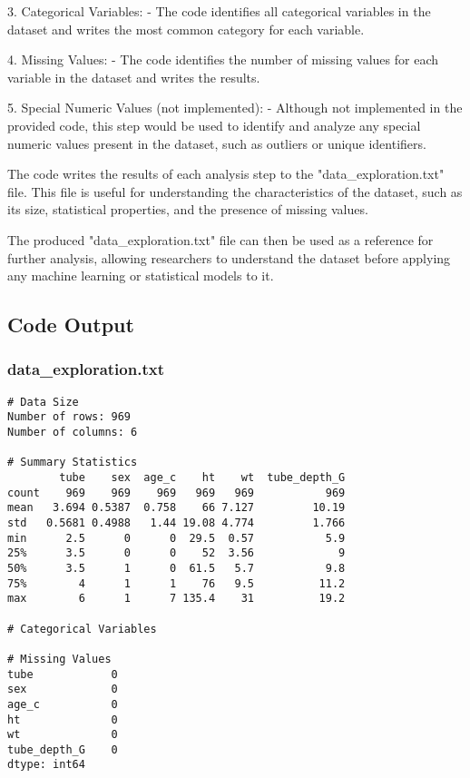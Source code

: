 \documentclass[11pt]{article}
\begin{document}
3. Categorical Variables:
   - The code identifies all categorical variables in the dataset and writes the most common category for each variable.

4. Missing Values:
   - The code identifies the number of missing values for each variable in the dataset and writes the results.

5. Special Numeric Values (not implemented):
   - Although not implemented in the provided code, this step would be used to identify and analyze any special numeric values present in the dataset, such as outliers or unique identifiers.

The code writes the results of each analysis step to the "data\_exploration.txt" file. This file is useful for understanding the characteristics of the dataset, such as its size, statistical properties, and the presence of missing values.

The produced "data\_exploration.txt" file can then be used as a reference for further analysis, allowing researchers to understand the dataset before applying any machine learning or statistical models to it.

\subsection{Code Output}

\subsubsection*{data\_exploration.txt}

\begin{Verbatim}[tabsize=4]
# Data Size
Number of rows: 969
Number of columns: 6

# Summary Statistics
        tube    sex  age_c    ht    wt  tube_depth_G
count    969    969    969   969   969           969
mean   3.694 0.5387  0.758    66 7.127         10.19
std   0.5681 0.4988   1.44 19.08 4.774         1.766
min      2.5      0      0  29.5  0.57           5.9
25%      3.5      0      0    52  3.56             9
50%      3.5      1      0  61.5   5.7           9.8
75%        4      1      1    76   9.5          11.2
max        6      1      7 135.4    31          19.2

# Categorical Variables

# Missing Values
tube            0
sex             0
age_c           0
ht              0
wt              0
tube_depth_G    0
dtype: int64

\end{Verbatim}
\end{document}
